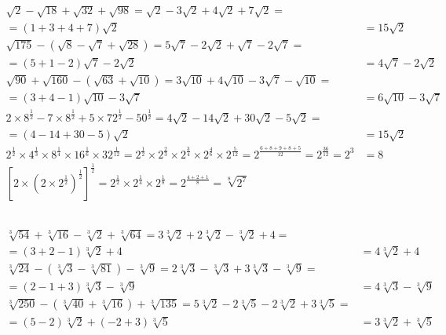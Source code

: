 \documentclass[a4paper,12pt]{article}
\begin{document}
\subsection{} %

\begin{align*}
\sqrt{2} - \sqrt{18} + \sqrt{32} + \sqrt{98}
= \sqrt{2} - 3\sqrt{2} + 4\sqrt{2} + 7\sqrt{2} = \\[6pt]
= (1 + 3 + 4 + 7)\sqrt{2}
&= 15\sqrt{2} \\[6pt] %
\sqrt{175} - (\sqrt{8} - \sqrt{7} + \sqrt{28})
= 5\sqrt{7} - 2\sqrt{2} + \sqrt{7} - 2\sqrt{7} = \\[6pt]
= (5 + 1 - 2)\sqrt{7} - 2\sqrt{2}
&= 4\sqrt{7} - 2\sqrt{2} \\[6pt]
\sqrt{90} + \sqrt{160} - (\sqrt{63} + \sqrt{10})
= 3\sqrt{10} + 4\sqrt{10} - 3\sqrt{7} - \sqrt{10} = \\[6pt]
= (3 + 4 - 1)\sqrt{10} - 3\sqrt{7}
&= 6\sqrt{10} - 3\sqrt{7} \\[6pt]
2 \times 8^{\frac{1}{2}} - 7 \times 8^{\frac{1}{2}} + 5 \times 72^{\frac{1}{2}} - 50^{\frac{1}{2}}
= 4\sqrt{2} - 14\sqrt{2} + 30\sqrt{2} - 5\sqrt{2} = \\[6pt]
= (4 - 14 + 30 - 5)\sqrt{2}
&= 15\sqrt{2} \\[6pt]
2^{\frac{1}{2}} \times 4^{\frac{1}{3}} \times 8^{\frac{1}{4}} \times 16^{\frac{1}{6}} \times 32^{\frac{1}{12}}
= 2^{\frac{1}{2}} \times 2^{\frac{2}{3}} \times 2^{\frac{3}{4}} \times 2^{\frac{4}{6}} \times 2^{\frac{5}{12}}
= 2^{\frac{6 + 8 + 9 + 8 + 5}{12}}
= 2^{\frac{36}{12}}
= 2^{3}
&= 8 \\[6pt]
[2 \times (2 \times 2^{\frac{1}{2}})^{\frac{1}{2}}]^{\frac{1}{2}}
= 2^{\frac{1}{2}} \times 2^{\frac{1}{4}} \times 2^{\frac{1}{8}}
= 2^{\frac{4 + 2 + 1}{8}}
= \sqrt[8]{2^7}
\end{align*}

\subsection{} %

\begin{align*}
\sqrt[3]{54} + \sqrt[3]{16} - \sqrt[3]{2} + \sqrt[3]{64}
= 3\sqrt[3]{2} + 2\sqrt[3]{2} - \sqrt[3]{2} + 4 = \\[6pt]
= (3 + 2 - 1)\sqrt[3]{2} + 4 
&= 4\sqrt[3]{2} + 4 \\[6pt]
\sqrt[3]{24} - (\sqrt[3]{3} - \sqrt[3]{81}) - \sqrt[3]{9}
= 2\sqrt[3]{3} - \sqrt[3]{3} + 3\sqrt[3]{3} - \sqrt[3]{9} = \\[6pt]
= (2 - 1 + 3)\sqrt[3]{3} - \sqrt[3]{9}
&= 4\sqrt[3]{3} - \sqrt[3]{9} \\[6pt]
\sqrt[3]{250} - (\sqrt[3]{40} + \sqrt[3]{16}) + \sqrt[3]{135}
= 5\sqrt[3]{2} - 2\sqrt[3]{5} - 2\sqrt[3]{2} + 3\sqrt[3]{5} = \\[6pt]
= (5 - 2)\sqrt[3]{2} + (-2 + 3)\sqrt[3]{5}
&= 3\sqrt[3]{2} + \sqrt[3]{5}
\end{align*}
\end{document}
